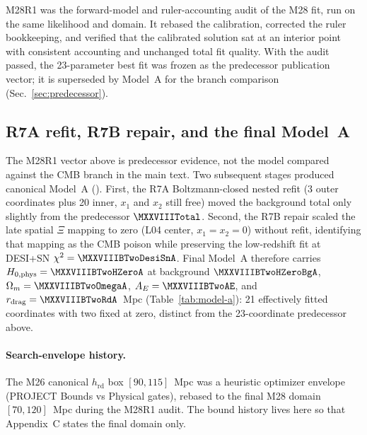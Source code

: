 M28R1 was the forward-model and ruler-accounting audit of the M28 fit,
run on the same likelihood and domain. It rebased the calibration,
corrected the ruler bookkeeping, and verified that the calibrated
solution sat at an interior point with consistent accounting and
unchanged total fit quality. With the audit passed, the 23-parameter
best fit was frozen as the predecessor publication vector; it is
superseded by Model~A for the branch comparison
(Sec.~\ref{sec:predecessor}).

\subsection{R7A refit, R7B repair, and the final Model~A}
\label{app:history-r7ab}

The M28R1 vector above is predecessor evidence, not the model compared
against the CMB branch in the main text. Two subsequent stages
produced canonical Model~A
(). First, the
R7A Boltzmann-closed nested refit (3 outer coordinates plus 20 inner,
$x_{1}$ and $x_{2}$ still free) moved the background total only
slightly from the predecessor $\MXXVIIITotal$. Second, the R7B repair
scaled the late spatial
$\Xi$ mapping to zero (L04 center, $x_{1}=x_{2}=0$) without refit,
identifying that mapping as the CMB poison while preserving the
low-redshift fit at DESI+SN $\chi^{2}=\MXXVIIIBTwoDesiSnA$. Final Model~A therefore carries
$H_{0,\mathrm{phys}}=\MXXVIIIBTwoHZeroA$\kmsMpc{} at background
$\MXXVIIIBTwoHZeroBgA$\kmsMpc{},
$\Omega_{m}=\MXXVIIIBTwoOmegaA$, $A_{E}=\MXXVIIIBTwoAE$, and
$r_{\mathrm{drag}}=\MXXVIIIBTwoRdA$~Mpc
(Table~\ref{tab:model-a}): 21 effectively fitted coordinates with two
fixed at zero, distinct from the 23-coordinate predecessor above.

\paragraph{Search-envelope history.}
The M26 canonical $h_{\mathrm{rd}}$ box $[90,115]$~Mpc was a heuristic
optimizer envelope (PROJECT Bounds vs Physical gates), rebased to the
final M28 domain $[70,120]$~Mpc during the M28R1 audit. The bound
history lives here so that Appendix~C states the final domain only.
